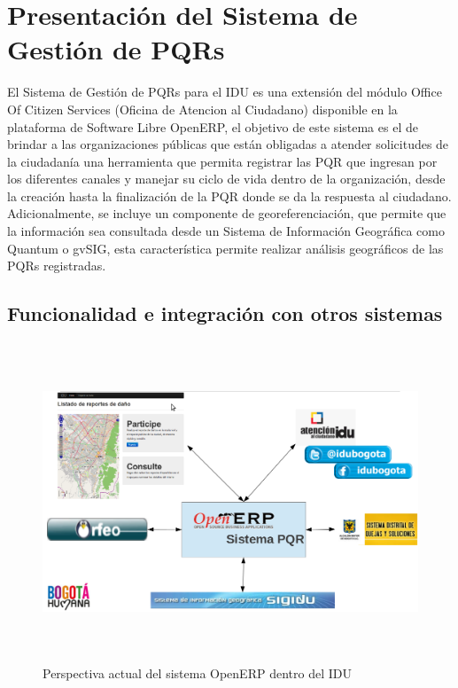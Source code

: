 \section{Presentación del Sistema de Gestión de PQRs}

El Sistema de Gestión de PQRs para el IDU es una extensión del módulo Office Of Citizen Services (Oficina de Atencion al Ciudadano) disponible 
en la plataforma de Software Libre OpenERP, 
el objetivo de este sistema es el de brindar a las organizaciones públicas que están obligadas a 
atender solicitudes de la ciudadanía una herramienta que permita registrar las PQR que ingresan por los diferentes canales y manejar su ciclo de vida
dentro de la organización, desde la creación hasta la finalización de la PQR donde se da la respuesta al ciudadano.\\
Adicionalmente, se incluye un componente de georeferenciación, que permite que la información 
sea consultada desde un Sistema de Información Geográfica como Quantum o gvSIG, esta característica permite realizar análisis geográficos de las PQRs registradas.\\

\subsection{Funcionalidad e integración con otros sistemas}

\begin{figure}[h]
 \includegraphics[width=17cm,height=9.5cm]{./Imagenes/slidesistemacompleto.png}
 \caption{Perspectiva actual del sistema OpenERP dentro del IDU}
 \label{fig:slidesistemacompleto}
\end{figure}

